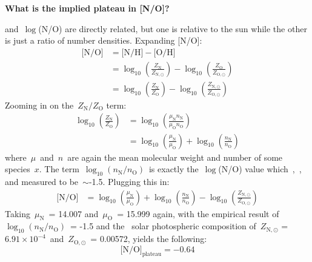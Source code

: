 \documentclass[12pt]{report}
\newcommand{\ddfrac}[2]{\frac{\displaystyle #1}{\displaystyle #2}}
\begin{document}
\newpage\noindent 
\textbf{What is the implied plateau in [N/O]?} 
\par\noindent 
[N/O] and~$\log$(N/O) are directly related, but one is relative to the sun 
while the other is just a ratio of number densities. Expanding [N/O]: 
\begin{subequations}\begin{align} 
\text{[N/O]} &= \text{[N/H]} - \text{[O/H]} \\ 
&= \log_{10}\left(\ddfrac{Z_\text{N}}{Z_{\text{N},\odot}}\right) - 
\log_{10}\left(\ddfrac{Z_\text{O}}{Z_{\text{O},\odot}}\right) 
\\ 
&= \log_{10}\left(\ddfrac{Z_\text{N}}{Z_\text{O}}\right) - \log_{10}\left(
\ddfrac{Z_{\text{N},\odot}}{Z_{\text{O},\odot}}\right) 
\end{align}\end{subequations} 
Zooming in on the~$Z_\text{N}/Z_\text{O}$ term: 
\begin{subequations}\begin{align} 
\log_{10}\left(\ddfrac{Z_\text{N}}{Z_\text{O}}\right) &= 
\log_{10}\left(\ddfrac{\mu_\text{N}n_\text{N}}{\mu_\text{O}n_\text{O}}\right) \\ 
&= \log_{10}\left(\ddfrac{\mu_\text{N}}{\mu_\text{O}}\right) + \log_{10}\left(
\ddfrac{n_\text{N}}{n_\text{O}}\right) 
\end{align}\end{subequations} 
where~$\mu$~and~$n$~are again the mean molecular weight and number of some 
species~$x$. The term~$\log_{10}\left(n_\text{N}/n_\text{O}\right)$~is exactly 
the~$\log$(N/O) value which~\citet{Berg2012},~\citet*{Izotov2012}, and 
\citet{James2015} measured to be~$\sim$-1.5. Plugging this in: 
\begin{subequations}\begin{align} 
\text{[N/O]} &= \log_{10}\left(\ddfrac{\mu_\text{N}}{\mu_\text{O}}\right) + 
\log_{10}\left(\ddfrac{n_\text{N}}{n_\text{O}}\right) - \log_{10}\left(
\ddfrac{Z_{\text{N},\odot}}{Z_{\text{O},\odot}}\right) 
\end{align}\end{subequations} 
Taking~$\mu_\text{N}$~= 14.007 and~$\mu_\text{O}$~= 15.999 again, with the 
empirical result of~$\log_{10}\left(n_\text{N}/n_\text{O}\right)$~= -1.5 and 
the~\citet{Asplund2009} solar photospheric composition of~$Z_{\text{N},\odot}$ 
= $6.91\times10^{-4}$~and~$Z_{\text{O},\odot}$~= 0.00572, yields the following: 
\begin{equation} 
\text{[N/O]}_\text{plateau} = -0.64 
\end{equation} 
\end{document}
